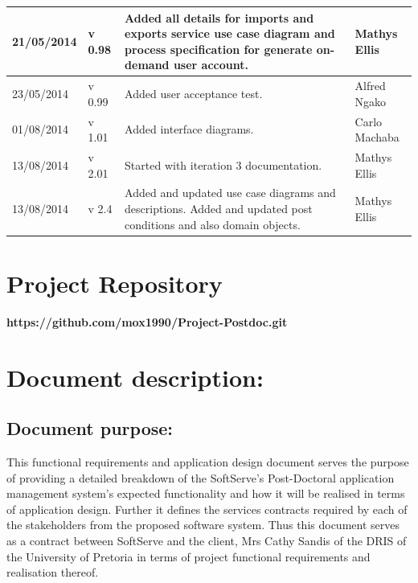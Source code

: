\documentclass[12pt]{article}
\newcommand{\repo}{https://github.com/mox1990/Project-Postdoc.git}
\begin{document}
\begin{center}
\begin{tabular}{|l|p{1.4cm}|p{8cm}|p{2.8cm}|}
\hline
21/05/2014 & v 0.98 & Added all details for imports and exports service use case diagram and process specification for generate on-demand user account. & Mathys Ellis \\
\hline
23/05/2014 & v 0.99 & Added user acceptance test. & Alfred Ngako \\
\hline
01/08/2014 & v 1.01 & Added interface diagrams. & Carlo Machaba \\
\hline
13/08/2014 & v 2.01 & Started with iteration 3 documentation. & Mathys Ellis \\
\hline
13/08/2014 & v 2.4 & Added and updated use case diagrams and descriptions. Added and updated post conditions and also domain objects. & Mathys Ellis \\
\hline

\end{tabular}
\end{center}
\newpage
\tableofcontents

\listoffigures
\newpage
\section{Project Repository}
\textbf{\repo}
\newpage
\section{Document description:}

\subsection{Document purpose:}
\vspace{0.2in}
This functional requirements and application design document serves the purpose of providing a detailed breakdown of the SoftServe's Post-Doctoral application management system's expected functionality and how it will be realised in terms of application design. Further it defines the services contracts required by each of the stakeholders from the proposed software system. Thus this document serves as a contract between SoftServe and the client, Mrs Cathy Sandis of the DRIS of the University of Pretoria in terms of project functional requirements and realisation thereof.

\vspace{0.2in}
\end{document}
